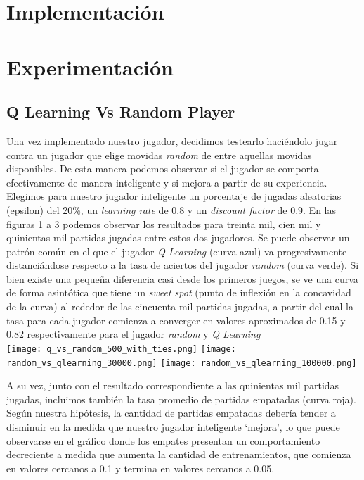 \documentclass[10pt,a4paper]{article}
\begin{document}
\section{Implementación}

\section{Experimentación}

\subsection{Q Learning Vs Random Player}

Una vez implementado nuestro jugador, decidimos testearlo haciéndolo jugar contra un jugador que elige movidas \textit{random} de entre aquellas movidas disponibles. De esta manera podemos observar si el jugador se comporta efectivamente de manera inteligente y si mejora a partir de su experiencia. Elegimos para nuestro jugador inteligente un porcentaje de jugadas aleatorias (epsilon) del 20\%, un \textit{learning rate} de 0.8 y un \textit{discount factor} de 0.9. En las figuras 1 a 3 podemos observar los resultados para treinta mil, cien mil y quinientas mil partidas jugadas entre estos dos jugadores. Se puede observar un patrón común en el que el jugador \textit{Q Learning} (curva azul) va progresivamente distanciándose respecto a la tasa de aciertos del jugador \textit{random} (curva verde).  Si bien existe una pequeña diferencia casi desde los primeros juegos, se ve una curva de forma asintótica que tiene un \textit{sweet spot} (punto de inflexión en la concavidad de la curva) al rededor de las cincuenta mil partidas jugadas, a partir del cual la tasa para cada jugador comienza a converger en valores aproximados de 0.15 y 0.82 respectivamente para el jugador \textit{random} y \textit{Q Learning}
\\

\texttt{[image: q\_vs\_random\_500\_with\_ties.png]}
\texttt{[image: random\_vs\_qlearning\_30000.png]}
\texttt{[image: random\_vs\_qlearning\_100000.png]}


A su vez, junto con el resultado correspondiente a las quinientas mil partidas jugadas, incluimos también la tasa promedio de partidas empatadas (curva roja). Según nuestra hipótesis, la cantidad de partidas empatadas debería tender a disminuir en la medida que nuestro jugador inteligente `mejora', lo que puede observarse en el gráfico donde los empates presentan un comportamiento decreciente a medida que aumenta la cantidad de entrenamientos, que comienza en valores cercanos a 0.1 y termina en valores cercanos a 0.05.
\\
\end{document}
